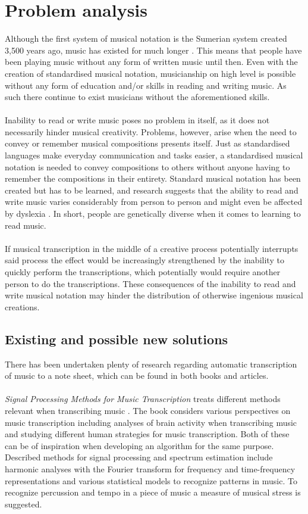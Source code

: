 \section{Problem analysis}
Although the first system of musical notation is the Sumerian system created 3,500 years ago, music has existed for much longer \cite{origins}. This means that people have been playing music without any form of written music until then. Even with the creation of standardised musical notation, musicianship on high level is possible without any form of education and/or skills in reading and writing music. As such there continue to exist musicians without the aforementioned skills. \\ \\
Inability to read or write music poses no problem in itself, as it does not necessarily hinder musical creativity. Problems, however, arise when the need to convey or remember musical compositions presents itself. Just as standardised languages make everyday communication and tasks easier, a standardised musical notation is needed to convey compositions to others without anyone having to remember the compositions in their entirety. Standard musical notation has been created but has to be learned, and research suggests that the ability to read and write music varies considerably from person to person and might even be affected by dyslexia \cite{dyslexia}. In short, people are genetically diverse when it comes to learning to read music.
\\ \\
If musical transcription in the middle of a creative process potentially interrupts said process the effect would be increasingly strengthened by the inability to quickly perform the transcriptions, which potentially would require another person to do the transcriptions. These consequences of the inability to read and write musical notation may hinder the distribution of otherwise ingenious musical creations.

\subsection{Existing and possible new solutions}
There has been undertaken plenty of research regarding automatic transcription of music to a note sheet, which can be found in both books and articles. 
\\ \\
\textit{Signal Processing Methods for Music Transcription} treats different methods relevant when transcribing music \cite{sol1}. 
The book considers various perspectives on music transcription including analyses of brain activity when transcribing music and studying different human strategies for music transcription. Both of these can be of inspiration when developing an algorithm for the same purpose. 
Described methods for signal processing and spectrum estimation include harmonic analyses with the Fourier transform for frequency and time-frequency representations and various statistical models to recognize patterns in music. 
To recognize percussion and tempo in a piece of music a measure of musical stress is suggested.

